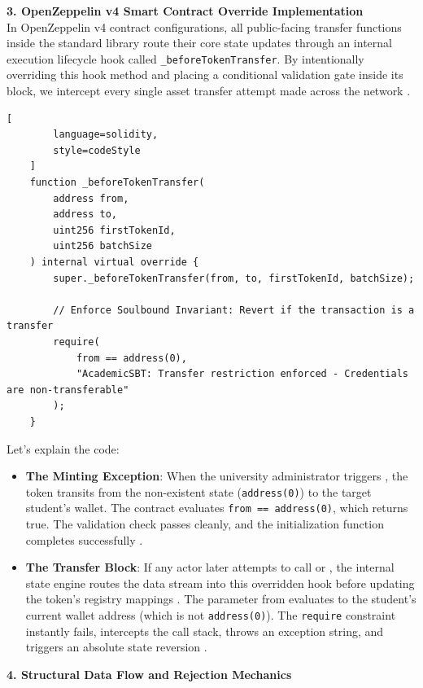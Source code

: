 \textbf{3. OpenZeppelin v4 Smart Contract Override Implementation}\\

In OpenZeppelin v4 contract configurations, all public-facing transfer functions inside the standard library route their core state updates through an internal execution lifecycle hook called \texttt{\_beforeTokenTransfer}. By intentionally overriding this hook method and placing a conditional validation gate inside its block, we intercept every single asset transfer attempt made across the network \cite{openzeppelin2026erc721}.

\begin{lstlisting}[
        language=solidity,
        style=codeStyle
    ]
    function _beforeTokenTransfer(
        address from,
        address to,
        uint256 firstTokenId,
        uint256 batchSize
    ) internal virtual override {
        super._beforeTokenTransfer(from, to, firstTokenId, batchSize);

        // Enforce Soulbound Invariant: Revert if the transaction is a transfer
        require(
            from == address(0),
            "AcademicSBT: Transfer restriction enforced - Credentials are non-transferable"
        );
    }
\end{lstlisting}


Let's explain the code:
\begin{itemize}
    \item \textbf{The Minting Exception}: When the university administrator triggers , the token transits from the non-existent state (\texttt{address(0)}) to the target student’s wallet. The contract evaluates \texttt{from == address(0)}, which returns true. The validation check passes cleanly, and the initialization function completes successfully \cite{onlinev0835web}.

    \item \textbf{The Transfer Block}: If any actor later attempts to call  or , the internal state engine routes the data stream into this overridden hook before updating the token's registry mappings \cite{nfterc721web}. The parameter from evaluates to the student's current wallet address (which is not \texttt{address(0)}). The \texttt{require} constraint instantly fails, intercepts the call stack, throws an exception string, and triggers an absolute state reversion \cite{ether2026ether}.
\end{itemize}

\textbf{4. Structural Data Flow and Rejection Mechanics}\\

